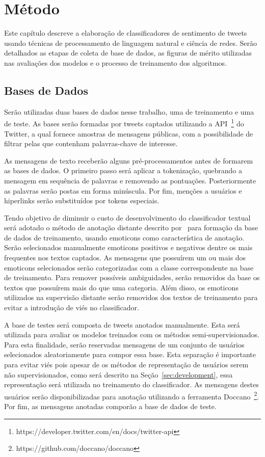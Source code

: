 \chapter{Método}
\label{chapter:method}

Este capítulo descreve a elaboração de classificadores de sentimento de tweets
usando técnicas de processamento de linguagem natural e ciência de redes.
Serão detalhados as etapas de coleta de base de dados, as figuras de mérito
utilizadas nas avaliações dos modelos e o processo de treinamento dos
algoritmos.

\section{Bases de Dados}

Serão utilizadas duas bases de dados nesse trabalho, uma de treinamento e uma de
teste.
As bases serão formadas por tweets captados utilizando a
API~\footnote{https://developer.twitter.com/en/docs/twitter-api} do Twitter,
a qual fornece amostras de mensagens públicas, com a possibilidade de filtrar
pelas que contenham palavras-chave de interesse.

As mensagens de texto receberão alguns pré-processamentos antes de formarem as
bases de dados.
O primeiro passo será aplicar a tokenização, quebrando a mensagem em sequência
de palavras e removendo as pontuações.
Posteriormente as palavras serão postas em forma minúscula.
Por fim, menções a usuários e hiperlinks serão substituídos por tokens especiais.

Tendo objetivo de diminuir o custo de desenvolvimento do classificador textual será
adotado o método de anotação distante descrito por~\citet{go09} para formação da
base de dados de treinamento, usando emoticons como característica de anotação.
Serão selecionados manualmente emoticons positivos e negativos dentre os mais
frequentes nos textos captados.
As mensagens que possuírem um ou mais dos emoticons selecionados serão
categorizadas com a classe correspondente na base de treinamento.
Para remover possíveis ambiguidades, serão removidos da base os textos que
possuírem mais do que uma categoria.
Além disso, os emoticons utilizados na supervisão distante serão removidos dos
textos de treinamento para evitar a introdução de viés no classificador.

A base de testes será composta de tweets anotados manualmente.
Esta será utilizada para avaliar os modelos treinados com os métodos
semi-supervisionados.
Para esta finalidade, serão reservadas mensagens de um conjunto de usuários
selecionados aleatoriamente para compor essa base.
Esta separação é importante para evitar viés pois apesar de os métodos de
representação de usuários serem não supervisionados, como será descrito na
Seção~\ref{sec:development}, essa representação será utilizada no treinamento do
classificador.
As mensagens destes usuários serão disponibilizadas para anotação utilizando a
ferramenta Doccano~\footnote{https://github.com/doccano/doccano}.
Por fim, as mensagens anotadas comporão a base de dados de teste.

